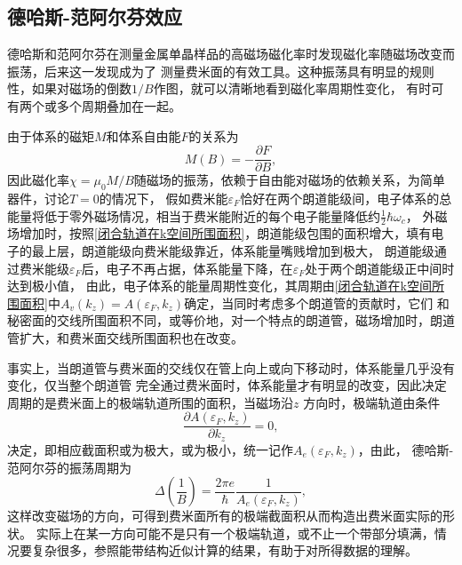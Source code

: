         \subsection{德哈斯-范阿尔芬效应}
            德哈斯和范阿尔芬在测量金属单晶样品的高磁场磁化率时发现磁化率随磁场改变而振荡，后来这一发现成为了
            测量费米面的有效工具。这种振荡具有明显的规则性，如果对磁场的倒数$1/B$作图，就可以清晰地看到磁化率周期性变化，
            有时可有两个或多个周期叠加在一起。

            由于体系的磁矩$M$和体系自由能$F$的关系为
            \begin{equation}
                M(B)=-\frac{\partial F}{\partial B},    
            \end{equation}
            因此磁化率$\chi=\mu_0 M/B$随磁场的振荡，依赖于自由能对磁场的依赖关系，为简单器件，讨论$T=0$的情况下，
            假如费米能$\varepsilon_F$恰好在两个朗道能级间，电子体系的总能量将低于零外磁场情况，相当于费米能附近的每个电子能量降低约$\frac{1}{2}\hbar\omega_c$，
            外磁场增加时，按照\autoref{闭合轨道在k空间所围面积}，朗道能级包围的面积增大，填有电子的最上层，朗道能级向费米能级靠近，体系能量嘴贱增加到极大，
            朗道能级通过费米能级$\varepsilon_F$后，电子不再占据，体系能量下降，在$\varepsilon_F$处于两个朗道能级正中间时达到极小值，
            由此，电子体系的能量周期性变化，其周期由\autoref{闭合轨道在k空间所围面积}中$A_v(k_z)=A(\varepsilon_F,k_z)$确定，当同时考虑多个朗道管的贡献时，它们
            和秘密面的交线所围面积不同，或等价地，对一个特点的朗道管，磁场增加时，朗道管扩大，和费米面交线所围面积也在改变。

            事实上，当朗道管与费米面的交线仅在管上向上或向下移动时，体系能量几乎没有变化，仅当整个朗道管
            完全通过费米面时，体系能量才有明显的改变，因此决定周期的是费米面上的极端轨道所围的面积，当磁场沿$z$
            方向时，极端轨道由条件
            \begin{equation}
                \frac{\partial A(\varepsilon_F,k_z)}{\partial k_z}=0,
            \end{equation}
            决定，即相应截面积或为极大，或为极小，统一记作$A_e(\varepsilon_F,k_z)$，由此，
            德哈斯-范阿尔芬的振荡周期为
            \begin{equation}
                \Delta\left(\frac{1}{B}\right)=\frac{2\pi e}{\hbar}\frac{1}{A_e(\varepsilon_F,k_z)}\label{德哈斯-范阿尔芬效应的振荡周期},
            \end{equation}
            这样改变磁场的方向，可得到费米面所有的极端截面积从而构造出费米面实际的形状。
            实际上在某一方向可能不是只有一个极端轨道，或不止一个带部分填满，情况要复杂很多，参照能带结构近似计算的结果，有助于对所得数据的理解。

